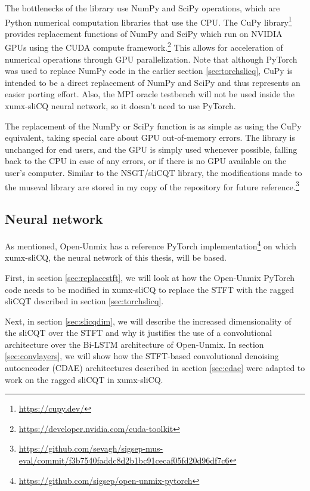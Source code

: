 \documentclass[report.tex]{subfiles}
\begin{document}
The bottlenecks of the library use NumPy and SciPy operations, which are Python numerical computation libraries that use the CPU. The CuPy library\footnote{\url{https://cupy.dev/}} provides replacement functions of NumPy and SciPy which run on NVIDIA GPUs using the CUDA compute framework.\footnote{\url{https://developer.nvidia.com/cuda-toolkit}} This allows for acceleration of numerical operations through GPU parallelization. Note that although PyTorch was used to replace NumPy code in the earlier section \ref{sec:torchslicq}, CuPy is intended to be a direct replacement of NumPy and SciPy and thus represents an easier porting effort. Also, the MPI oracle testbench will not be used inside the xumx-sliCQ neural network, so it doesn't need to use PyTorch.

The replacement of the NumPy or SciPy function is as simple as using the CuPy equivalent, taking special care about GPU out-of-memory errors. The library is unchanged for end users, and the GPU is simply used whenever possible, falling back to the CPU in case of any errors, or if there is no GPU available on the user's computer. Similar to the NSGT/sliCQT library, the modifications made to the museval library are stored in my copy of the repository for future reference.\footnote{\url{https://github.com/sevagh/sigsep-mus-eval/commit/f3b7540faddc8d2b1bc91cecaf05fd20d96df7c6}}

\newpagefill

\subsection{Neural network}
\label{sec:neuralnet}

As mentioned, Open-Unmix has a reference PyTorch implementation\footnote{\url{https://github.com/sigsep/open-unmix-pytorch}} on which xumx-sliCQ, the neural network of this thesis, will be based.

First, in section \ref{sec:replacestft}, we will look at how the Open-Unmix PyTorch code needs to be modified in xumx-sliCQ to replace the STFT with the ragged sliCQT described in section \ref{sec:torchslicq}.

Next, in section \ref{sec:slicqdim}, we will describe the increased dimensionality of the sliCQT over the STFT and why it justifies the use of a convolutional architecture over the Bi-LSTM architecture of Open-Unmix. In section \ref{sec:convlayers}, we will show how the STFT-based convolutional denoising autoencoder (CDAE) architectures described in section \ref{sec:cdae} were adapted to work on the ragged sliCQT in xumx-sliCQ.
\end{document}
